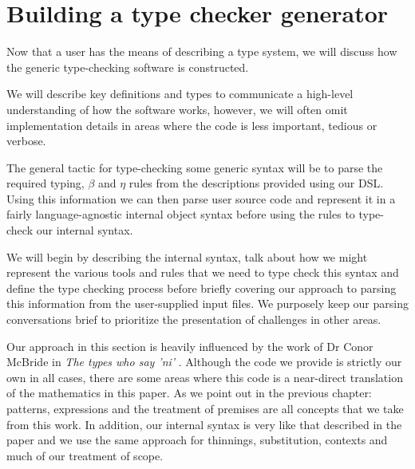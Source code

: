 \chapter{Building a type checker generator}

Now that a user has the means of describing a type system, we will
discuss how the generic type-checking software is constructed.

We will describe key definitions and types to communicate a
high-level understanding of how the software works,
however, we will often omit implementation details in areas where the
code is less important, tedious or verbose.

The general tactic for type-checking some generic syntax will be to
parse the required typing, $\beta$ and $\eta$ rules from the
descriptions provided using our DSL. Using this information we can
then parse user source code and represent it in a fairly
language-agnostic internal object syntax before using the rules
to type-check our internal syntax.

We will begin by describing the internal syntax, talk about how we
might represent the various tools and rules that we need to
type check this syntax and define the type checking process before
briefly covering our approach to parsing this information from the
user-supplied input files. We purposely keep our parsing conversations
brief to prioritize the presentation of challenges in other areas.

Our approach in this section is heavily influenced by the work of
Dr Conor McBride in \emph{The types who say 'ni'} \cite{TypesWhoSayNi}.
Although the code we provide is strictly our own in all cases, there
are some areas where this code is a near-direct translation of
the mathematics in this paper. As we point out in the previous
chapter: patterns, expressions and the treatment of premises are
all concepts that we take from this work. In addition, our internal
syntax is very like that described in the paper and we use the same
approach for thinnings, substitution, contexts and much of our
treatment of scope.

\\\\
















